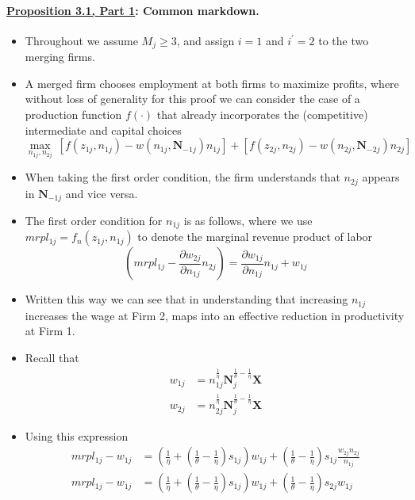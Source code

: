 \documentclass[12pt]{article}
\theoremstyle{prop}
\begin{document}
\paragraph{\underline{Proposition 3.1, Part 1}: Common markdown.}
\begin{itemize}
	\item Throughout we assume $M_{j}\geq3$, and assign $i=1$ and $i^{\prime}=2$
	to the two merging firms.
	\item A merged firm chooses employment at both firms to maximize profits,
	where without loss of generality for this proof we can consider the
	case of a production function $f$$\left(\cdot\right)$ that already
	incorporates the (competitive) intermediate and capital choices
	\[
	\max_{n_{1j},n_{2j}}\:\left[f\left(z_{1j},n_{1j}\right)-w\left(n_{1j},\mathbf{N}_{-1j}\right)n_{1j}\right]+\left[f\left(z_{2j},n_{2j}\right)-w\left(n_{2j},\mathbf{N}_{-2j}\right)n_{2j}\right]
	\]
	\item When taking the first order condition, the firm understands that $n_{2j}$
	appears in $\mathbf{N}_{-1j}$ and vice versa.
	\item The first order condition for $n_{1j}$ is as follows, where we use
	$mrpl_{1j}=f_{n}\left(z_{1j},n_{1j}\right)$ to denote the marginal
	revenue product of labor
	\[
	\left(mrpl_{1j}-\frac{\partial w_{2j}}{\partial n_{1j}}n_{2j}\right)=\frac{\partial w_{1j}}{\partial n_{1j}}n_{1j}+w_{1j}
	\]
	\item Written this way we can see that in understanding that increasing
	$n_{1j}$ increases the wage at Firm 2, maps into an effective reduction
	in productivity at Firm 1.
	\item Recall that
	\begin{align*}
		w_{1j} & =n_{1j}^{\frac{1}{\eta}}\mathbf{N}_{j}^{\frac{1}{\theta}-\frac{1}{\eta}}\boldsymbol{X}\\
		w_{2j} & =n_{2j}^{\frac{1}{\eta}}\mathbf{N}_{j}^{\frac{1}{\theta}-\frac{1}{\eta}}\boldsymbol{X}
	\end{align*}
	\item Using this expression
	\begin{align*}
		mrpl_{1j}-w_{1j} & =\left(\frac{1}{\eta}+\left(\frac{1}{\theta}-\frac{1}{\eta}\right)s_{1j}\right)w_{1j}+\left(\frac{1}{\theta}-\frac{1}{\eta}\right)s_{1j}\frac{w_{2j}n_{2j}}{n_{1j}}\\
		mrpl_{1j}-w_{1j} & =\left(\frac{1}{\eta}+\left(\frac{1}{\theta}-\frac{1}{\eta}\right)s_{1j}\right)w_{1j}+\left(\frac{1}{\theta}-\frac{1}{\eta}\right)s_{2j}w_{1j}\\

\end{align*}$$
\end{itemize}
\end{document}

